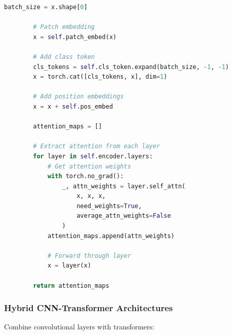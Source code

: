\documentclass[11pt]{article}
\begin{document}
\begin{lstlisting}[language=Python, caption=Vision Transformer Implementation]
        batch_size = x.shape[0]
        
        # Patch embedding
        x = self.patch_embed(x)
        
        # Add class token
        cls_tokens = self.cls_token.expand(batch_size, -1, -1)
        x = torch.cat([cls_tokens, x], dim=1)
        
        # Add position embeddings
        x = x + self.pos_embed
        
        attention_maps = []
        
        # Extract attention from each layer
        for layer in self.encoder.layers:
            # Get attention weights
            with torch.no_grad():
                _, attn_weights = layer.self_attn(
                    x, x, x,
                    need_weights=True,
                    average_attn_weights=False
                )
            attention_maps.append(attn_weights)
            
            # Forward through layer
            x = layer(x)
        
        return attention_maps
\end{lstlisting}

\subsubsection{Hybrid CNN-Transformer Architectures}

Combine convolutional layers with transformers:
\end{document}
